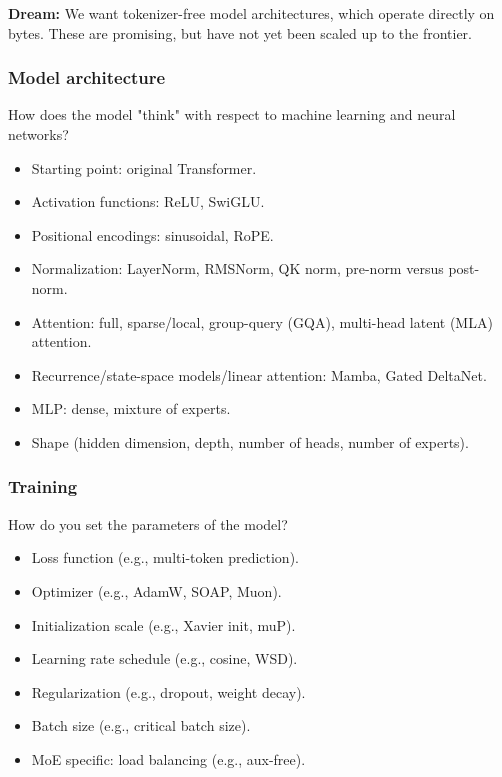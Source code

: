 \documentclass[12pt,twoside]{article}
\begin{document}
\textbf{Dream:} We want tokenizer-free model architectures, which operate directly on bytes. These are promising, but have not yet been scaled up to the frontier.

\subsubsection*{Model architecture}

How does the model "think" with respect to machine learning and neural networks?

\begin{itemize}
    \item Starting point: original Transformer.
    \item Activation functions: ReLU, SwiGLU.
    \item Positional encodings: sinusoidal, RoPE.
    \item Normalization: LayerNorm, RMSNorm, QK norm, pre-norm versus post-norm.
    \item Attention: full, sparse/local, group-query (GQA), multi-head latent (MLA) attention.
    \item Recurrence/state-space models/linear attention: Mamba, Gated DeltaNet.
    \item MLP: dense, mixture of experts.
    \item Shape (hidden dimension, depth, number of heads, number of experts).
\end{itemize}

\subsubsection*{Training}

How do you set the parameters of the model?

\begin{itemize}
    \item Loss function (e.g., multi-token prediction).
    \item Optimizer (e.g., AdamW, SOAP, Muon).
    \item Initialization scale (e.g., Xavier init, muP).
    \item Learning rate schedule (e.g., cosine, WSD).
    \item Regularization (e.g., dropout, weight decay).
    \item Batch size (e.g., critical batch size).
    \item MoE specific: load balancing (e.g., aux-free).
\end{itemize}
\end{document}
